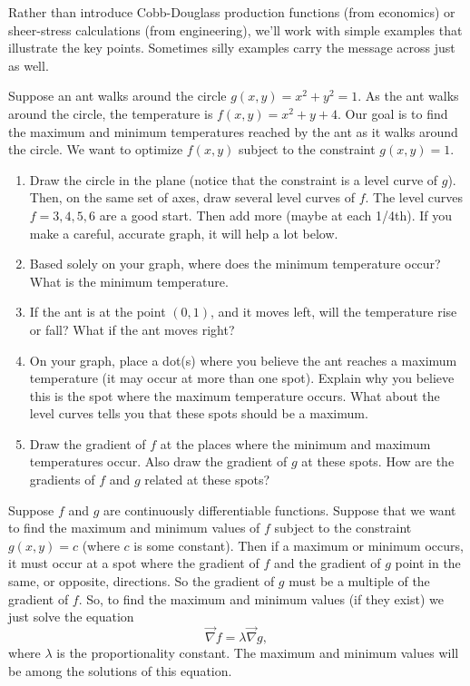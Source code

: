 Rather than introduce Cobb-Douglass production functions (from economics) or sheer-stress calculations (from engineering), we'll work with simple examples that illustrate the key points.  Sometimes silly examples carry the message across just as well.

\begin{problem}
 Suppose an ant walks around the circle $g(x,y)=x^2+y^2=1$.  As the ant walks around the circle, the temperature is $f(x,y) = x^2+y+4$.  Our goal is to find the maximum and minimum temperatures reached by the ant as it walks around the circle. We want to optimize $f(x,y)$ subject to the constraint $g(x,y)=1$. 
 \begin{enumerate}
  \item Draw the circle in the plane (notice that the constraint is a level curve of $g$).  Then, on the same set of axes, draw several level curves of $f$. The level curves $f=3, 4, 5, 6$ are a good start. Then add more (maybe at each 1/4th). If you make a careful, accurate graph, it will help a lot below.
  \item Based solely on your graph, where does the minimum temperature occur?  What is the minimum temperature.
  \item If the ant is at the point $(0,1)$, and it moves left, will the temperature rise or fall?  What if the ant moves right? 
  \item On your graph, place a dot(s) where you believe the ant reaches a maximum temperature (it may occur at more than one spot). Explain why you believe this is the spot where the maximum temperature occurs. What about the level curves tells you that these spots should be a maximum.
  \item Draw the gradient of $f$ at the places where the minimum and maximum temperatures occur. Also draw the gradient of $g$ at these spots.  How are the gradients of $f$ and $g$ related at these spots?
 \end{enumerate}
\end{problem}

\begin{theorem}
Suppose $f$ and $g$ are continuously differentiable functions. Suppose that we want to find the maximum and minimum values of $f$ subject to the constraint $g(x,y)=c$ (where $c$ is some constant).  Then if a maximum or minimum occurs, it must occur at a spot where the gradient of $f$ and the gradient of $g$ point in the same, or opposite, directions. So the gradient of $g$ must be a multiple of the gradient of $f$. So, to find the maximum and minimum values (if they exist) we just solve the equation 
$$\vec \nabla f = \lambda \vec \nabla g,$$ where $\lambda$ is the proportionality constant. The maximum and minimum values will be among the solutions of this equation. 
\end{theorem}

